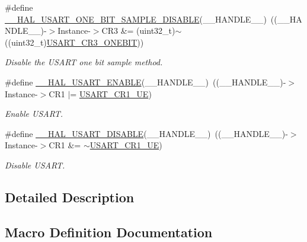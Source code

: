 \begin{DoxyCompactItemize}
\#define \hyperlink{group___u_s_a_r_t___exported___macros_ga78be92ca3073a9029f4696dc2fbb7b71}{\+\_\+\+\_\+\+H\+A\+L\+\_\+\+U\+S\+A\+R\+T\+\_\+\+O\+N\+E\+\_\+\+B\+I\+T\+\_\+\+S\+A\+M\+P\+L\+E\+\_\+\+D\+I\+S\+A\+B\+LE}(\+\_\+\+\_\+\+H\+A\+N\+D\+L\+E\+\_\+\+\_\+)~((\+\_\+\+\_\+\+H\+A\+N\+D\+L\+E\+\_\+\+\_\+)-\/$>$Instance-\/$>$C\+R3 \&= (uint32\+\_\+t)$\sim$((uint32\+\_\+t)\hyperlink{group___peripheral___registers___bits___definition_ga9a96fb1a7beab602cbc8cb0393593826}{U\+S\+A\+R\+T\+\_\+\+C\+R3\+\_\+\+O\+N\+E\+B\+IT}))
\begin{DoxyCompactList}\small\item\em Disable the U\+S\+A\+RT one bit sample method. \end{DoxyCompactList}\item 
\#define \hyperlink{group___u_s_a_r_t___exported___macros_ga60e106d6d610ea5fa1ab2d5ca079a8cf}{\+\_\+\+\_\+\+H\+A\+L\+\_\+\+U\+S\+A\+R\+T\+\_\+\+E\+N\+A\+B\+LE}(\+\_\+\+\_\+\+H\+A\+N\+D\+L\+E\+\_\+\+\_\+)~((\+\_\+\+\_\+\+H\+A\+N\+D\+L\+E\+\_\+\+\_\+)-\/$>$Instance-\/$>$C\+R1 $\vert$=  \hyperlink{group___peripheral___registers___bits___definition_ga2bb650676aaae4a5203f372d497d5947}{U\+S\+A\+R\+T\+\_\+\+C\+R1\+\_\+\+UE})
\begin{DoxyCompactList}\small\item\em Enable U\+S\+A\+RT. \end{DoxyCompactList}\item 
\#define \hyperlink{group___u_s_a_r_t___exported___macros_ga8cc760b7a382db42655d21a5edbfc227}{\+\_\+\+\_\+\+H\+A\+L\+\_\+\+U\+S\+A\+R\+T\+\_\+\+D\+I\+S\+A\+B\+LE}(\+\_\+\+\_\+\+H\+A\+N\+D\+L\+E\+\_\+\+\_\+)~((\+\_\+\+\_\+\+H\+A\+N\+D\+L\+E\+\_\+\+\_\+)-\/$>$Instance-\/$>$C\+R1 \&=  $\sim$\hyperlink{group___peripheral___registers___bits___definition_ga2bb650676aaae4a5203f372d497d5947}{U\+S\+A\+R\+T\+\_\+\+C\+R1\+\_\+\+UE})
\begin{DoxyCompactList}\small\item\em Disable U\+S\+A\+RT. \end{DoxyCompactList}\end{DoxyCompactItemize}


\subsection{Detailed Description}


\subsection{Macro Definition Documentation}
\mbox{\label{group___u_s_a_r_t___exported___macros_ga816bc7a3be6d6a96e4b69078679d9d4c}} 
